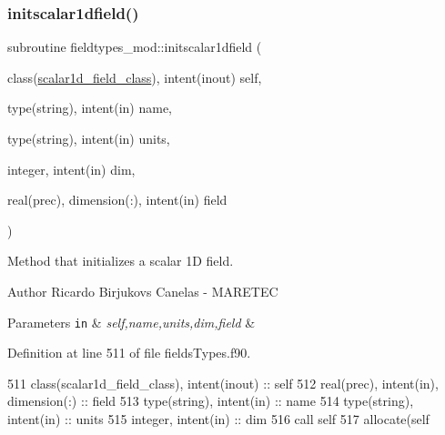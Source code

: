 \subsubsection{\texorpdfstring{initscalar1dfield()}{initscalar1dfield()}}
{\footnotesize\ttfamily subroutine fieldtypes\+\_\+mod\+::initscalar1dfield (\begin{DoxyParamCaption}\item[{class(\mbox{\hyperlink{structfieldtypes__mod_1_1scalar1d__field__class}{scalar1d\+\_\+field\+\_\+class}}), intent(inout)}]{self,  }\item[{type(string), intent(in)}]{name,  }\item[{type(string), intent(in)}]{units,  }\item[{integer, intent(in)}]{dim,  }\item[{real(prec), dimension(\+:), intent(in)}]{field }\end{DoxyParamCaption})\hspace{0.3cm}{\ttfamily [private]}}



Method that initializes a scalar 1D field. 

\begin{DoxyAuthor}{Author}
Ricardo Birjukovs Canelas -\/ M\+A\+R\+E\+T\+EC 
\end{DoxyAuthor}

\begin{DoxyParams}[1]{Parameters}
\mbox{\tt in}  & {\em self,name,units,dim,field} & \\
\hline
\end{DoxyParams}


Definition at line 511 of file fields\+Types.\+f90.


\begin{DoxyCode}
511     \textcolor{keywordtype}{class}(scalar1d\_field\_class), \textcolor{keywordtype}{intent(inout)} :: self
512     \textcolor{keywordtype}{real(prec)}, \textcolor{keywordtype}{intent(in)}, \textcolor{keywordtype}{dimension(:)} :: field
513     \textcolor{keywordtype}{type}(string), \textcolor{keywordtype}{intent(in)} :: name
514     \textcolor{keywordtype}{type}(string), \textcolor{keywordtype}{intent(in)} :: units
515     \textcolor{keywordtype}{integer}, \textcolor{keywordtype}{intent(in)} :: dim
516     \textcolor{keyword}{call }self%
517     \textcolor{keyword}{allocate}(self%
\end{DoxyCode}
\mbox{\label{namespacefieldtypes__mod_a1a3160727c99017639d758aad9031df5}} 
